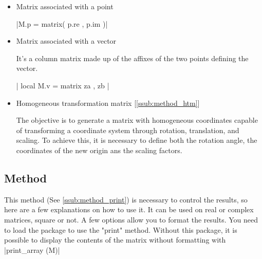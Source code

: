 \begin{itemize}
\begin{tkzexample}[latex=.5\textwidth]
\end{tkzexample}


\item Matrix associated with a point

  |M.p = matrix({ { p.re }, { p.im } })|

\item Matrix associated with a vector

It's a column matrix made up of the affixes of the two points defining the vector.

| local M.v = matrix{ { za }, { zb } }|

\begin{tkzexample}[latex=.5\textwidth]
\end{tkzexample}



\item  Homogeneous transformation matrix [\ref{ssub:method_htm}]

  The objective is to generate a matrix with homogeneous coordinates capable of transforming a coordinate system through rotation, translation, and scaling. To achieve this, it is necessary to define both the rotation angle, the coordinates of the new origin ans the scaling factors.

\begin{tkzexample}[latex=.35\textwidth]
\end{tkzexample}

\end{itemize}

\subsection{Method }
\label{sub:display_a_matrix_method_print}


This method (See  \ref{ssub:method_print}) is necessary to control the results, so here are a few explanations on how to use it. It can be used on real or complex matrices, square or not. A few options allow you to format the results. You need to load the  package to use the "print" method. Without this package, it is possible to display the contents of the matrix without formatting with |print_array (M)|

